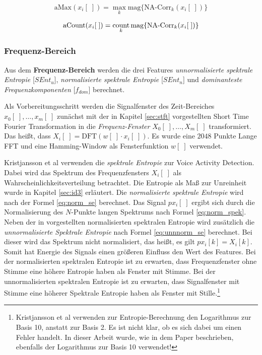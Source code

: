 \begin{equation}
\text{aMax}(x_i[\;]) = \max_{k}\text{mag}\{\text{NA-Corr}_k(x_i[\;])\}
\label{eq:corrpeak}
\end{equation}

\begin{equation}
\text{aCount}(x_i[\;]) = \operatorname*{count}_{k}\text{mag}\{\text{NA-Corr}_k(x_i[\;])\}
\label{eq:corrcount}
\end{equation}


\subsubsection{Frequenz-Bereich}

Aus dem \textbf{Frequenz-Bereich} werden die drei Features \emph{unnormalisierte spektrale Entropie} [$SEnt_{u}$], \emph{normalisierte spektrale Entropie}  [$SEnt_{n}$] und \emph{dominanteste Frequenzkomponenten} [$f_{dom}$] berechnet. 

Als Vorbereitungsschritt werden die Signalfenster des Zeit-Bereiches $x_0[\;] , \ldots , x_m[\;]$ zunächst mit der in Kapitel \ref{sec:stft} vorgestellten Short Time Fourier Transformation in die \emph{Frequenz-Fenster} \label{eq:stft} $X_0[\;] , \ldots , X_m[\;]$ transformiert. Das heißt, dass $X_i[\;] = \text{DFT}(w[\;] \cdot x_i[\;])$. Es wurde eine $2048$ Punkte Lange FFT und eine Hamming-Window als Fensterfunktion $w[\;]$ verwendet.

Kristjansson et al \cite[S. 2]{vad_Lisboa} verwenden die \emph{spektrale Entropie} zur Voice Activity Detection. Dabei wird das Spektrum des Frequenzfensters $X_i[\;]$ als Wahrscheinlichkeitsverteilung betrachtet. Die Entropie als Maß zur \glqq Unreinheit\grqq{} wurde in Kapitel \ref{sec:id3} erläutert. Die \emph{normalisierte spektrale Entropie} wird nach der Formel \ref{eq:norm_se} berechnet. Das Signal $px_i[\;]$ ergibt sich durch die Normalisierung des $N$-Punkte langen Spektrums nach Formel \ref{eq:norm_spek}. Neben der in \cite{vad_Lisboa} vorgestellten normalisierten spektralen Entropie wird zusätzlich die \emph{unnormalisierte Spektrale Entropie} nach Formel \ref{eq:unnnorm_se} berechnet. Bei dieser wird das Spektrum nicht normalisiert, das heißt, es gilt $px_i[k] = X_i[k]$. Somit hat Energie des Signals einen größeren Einfluss den Wert des Features. Bei der normalisierten spektralen Entropie ist zu erwarten, dass Frequenzfenster ohne Stimme eine höhere Entropie haben als Fenster mit Stimme. Bei der unnormalisierten spektralen Entropie ist zu erwarten, dass Signalfenster mit Stimme eine höherer Spektrale Entropie haben als Fenster mit Stille.\footnote{Kristjansson et al \cite[S. 2]{vad_Lisboa} verwenden zur Entropie-Berechnung den Logarithmus zur Basis 10, anstatt zur Basis 2. Es ist nicht klar, ob es sich dabei um einen Fehler handelt. In dieser Arbeit wurde, wie in dem Paper beschrieben, ebenfalls der Logarithmus zur Basis 10 verwendet!}

